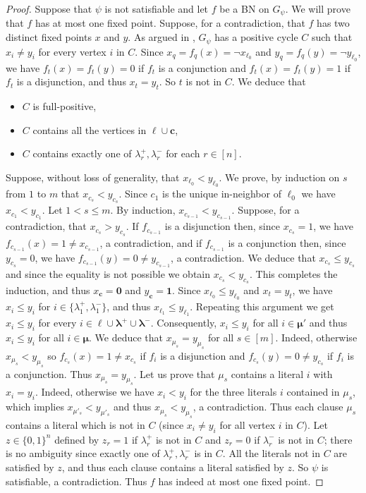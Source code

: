 \documentclass[11pt,letter]{article}
\newcommand{\BF}[1]{{{\boldmath{\bf #1}\unboldmath}}}
\newcommand{\B}{\{0,1\}}
\newcommand{\ONE}{\mathbf{1}}
\newcommand{\ZERO}{{\mathbf{0}}}
\newcommand{\LAMBDA}{\boldsymbol{\lambda}}
\newcommand{\MU}{\boldsymbol{\mu}}
\newcommand{\ELL}{\boldsymbol{\ell}}
\newcommand{\C}{\boldsymbol{c}}
\begin{document}
\begin{proof}
\BF{($1\Rightarrow 2$)} Suppose that $\psi$ is not satisfiable and let $f$ be a BN on $G_\psi$. We will prove that $f$ has at most one fixed point. Suppose, for a contradiction, that $f$ has two distinct fixed points $x$ and $y$. As argued in \cite{A08}, $G_\psi$ has a positive cycle $C$ such that $x_i\neq y_i$ for every vertex $i$ in $C$. Since  $x_q=f_q(x)=\neg x_{\ell_0}$ and  $y_q=f_q(y)=\neg y_{\ell_0}$, we have $f_t(x)=f_t(y)=0$ if $f_t$ is a conjunction and $f_t(x)=f_t(y)=1$ if $f_t$ is a disjunction, and thus $x_t=y_t$. So $t$ is not in $C$. We deduce that
\begin{itemize}
\item
$C$ is full-positive,
\item
$C$ contains all the vertices in $\ELL\cup\C$,
\item
$C$ contains exactly one of $\lambda^+_r,\lambda^-_r$ for each $r\in [n]$.
\end{itemize}
Suppose, without loss of generality, that $x_{\ell_0}<y_{\ell_0}$. We prove, by induction on $s$ from $1$ to $m$ that $x_{c_s}<y_{c_s}$. Since $c_1$ is the unique in-neighbor of $\ell_0$ we have $x_{c_1}<y_{c_1}$. Let $1<s\leq m$. By induction, $x_{c_{s-1}}<y_{c_{s-1}}$. Suppose, for a contradiction, that $x_{c_s}>y_{c_s}$. If $f_{c_{s-1}}$ is a disjunction then, since $x_{c_s}=1$, we have $f_{c_{s-1}}(x)=1\neq x_{c_{s-1}}$, a contradiction, and if $f_{c_{s-1}}$ is a conjunction then, since $y_{c_s}=0$, we have $f_{c_{s-1}}(y)=0\neq y_{c_{s-1}}$, a contradiction. We deduce that $x_{c_s}\leq y_{c_s}$ and since the equality is not possible we obtain $x_{c_s}<y_{c_s}$. This completes the induction, and thus $x_{\C}=\ZERO$ and $y_{\C}=\ONE$. Since $x_{\ell_0}\leq y_{\ell_0}$ and $x_t=y_t$, we have $x_i\leq y_i$ for $i\in\{\lambda^+_1,\lambda^-_1\}$, and thus $x_{\ell_1}\leq y_{\ell_1}$. Repeating this argument we get $x_i\leq y_i$ for every $i\in \ELL\cup\LAMBDA^+\cup\LAMBDA^-$. Consequently, $x_i\leq y_i$ for all $i\in \MU'$ and thus $x_i\leq y_i$ for all $i\in \MU$. We deduce that $x_{\mu_s}=y_{\mu_s}$ for all $s\in [m]$. Indeed, otherwise $x_{\mu_s}<y_{\mu_s}$ so $f_{c_s}(x)=1\neq x_{c_s}$ if $f_i$ is a disjunction and $f_{c_s}(y)=0\neq y_{c_s}$ if $f_i$ is a conjunction. Thus $x_{\mu_s}=y_{\mu_s}$. Let us prove that $\mu_s$ contains a literal $i$ with $x_i=y_i$. Indeed, otherwise we have $x_i<y_i$ for the three literals $i$ contained in $\mu_s$, which implies $x_{\mu'_s}<y_{\mu'_s}$ and thus $x_{\mu_s}<y_{\mu_s}$, a contradiction. Thus each clause $\mu_s$ contains a literal which is not in $C$ (since $x_i\neq y_i$ for all vertex $i$ in $C$). Let $z\in\B^n$ defined by $z_r=1$ if $\lambda^+_r$ is not in $C$ and $z_r=0$ if $\lambda^-_r$ is not in $C$; there is no ambiguity since exactly one of $\lambda^+_r,\lambda^-_r$ is in $C$. All the literals not in $C$ are satisfied by $z$, and thus each clause contains a literal satisfied by $z$. So $\psi$ is satisfiable, a contradiction. Thus $f$ has indeed at most one fixed point. 


\end{proof}
\end{document}
